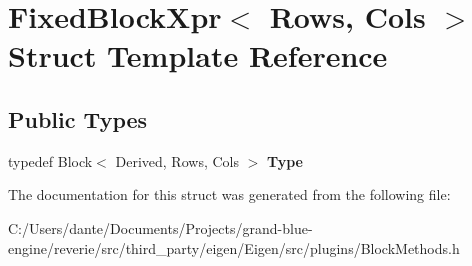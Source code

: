 \hypertarget{struct_fixed_block_xpr}{}\section{Fixed\+Block\+Xpr$<$ Rows, Cols $>$ Struct Template Reference}
\label{struct_fixed_block_xpr}
\subsection*{Public Types}
\begin{DoxyCompactItemize}
\item 
\mbox{\label{struct_fixed_block_xpr_afb4001131b91bbd49660b307ff7aa8fa}} 
typedef Block$<$ Derived, Rows, Cols $>$ {\bfseries Type}
\end{DoxyCompactItemize}


The documentation for this struct was generated from the following file\+:\begin{DoxyCompactItemize}
\item 
C\+:/\+Users/dante/\+Documents/\+Projects/grand-\/blue-\/engine/reverie/src/third\+\_\+party/eigen/\+Eigen/src/plugins/Block\+Methods.\+h\end{DoxyCompactItemize}
